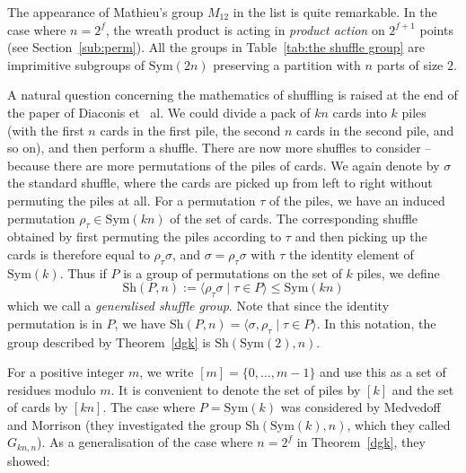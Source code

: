 \documentclass[12pt]{amsart}
\theoremstyle{remark}
\theoremstyle{definition}
\newcommand{\sym}{\mathrm{Sym}}
\newcommand{\sh}{\mathrm{Sh}}
\begin{document}
The appearance of Mathieu's group $M_{12}$ in the  list is quite remarkable. In the case where $n=2^f$, the wreath product  is acting in \emph{product action} on $2^{f+1}$ points (see Section~\ref{sub:perm}). All the groups in Table~\ref{tab:the shuffle group} are imprimitive subgroups of $\sym(2n)$ preserving a partition with $n$ parts of size $2$.


A natural question concerning the mathematics of shuffling is raised at the end of the paper of Diaconis et ~al. We could divide a pack of $kn$ cards into $k$ piles (with the first $n$ cards in the first pile, the second $n$ cards in the second pile, and so on), and then perform a shuffle. There are now more shuffles to consider -- because there are more permutations of the piles of cards. We again denote by $\sigma$ the standard shuffle, where the cards are picked up from left to right without permuting the piles at all. For a permutation $\tau$ of the piles, we have an induced permutation $\rho_\tau \in \sym(kn)$ of the set of cards. The corresponding shuffle obtained by first permuting the piles according to $\tau$ and then picking up the cards is therefore equal to $\rho_\tau \sigma$, and $\sigma = \rho_\tau\sigma$ with $\tau$ the identity element of $\sym(k)$. Thus if $P$ is a group of permutations on the set of $k$ piles, we define
$$\sh(P,n) := \langle \rho_\tau \sigma  \mid \tau \in P \rangle \leqslant \sym(kn)$$
which we call a \emph{generalised shuffle group}. Note that since the identity permutation is in $P$, we have $\sh(P,n ) = \langle \sigma, \rho_\tau \mid \tau \in P \rangle$.
%
In this notation, the group described by Theorem~\ref{dgk} is $\sh(\sym(2),n)$. 

For a positive integer $m$, we write $[m]=\{0,\dots,m-1\}$ and use this as a set of residues modulo $m$. It is convenient to denote the set of piles by $[k]$ and the set of cards by $[kn]$. 
The case where $P=\sym(k)$ was considered by Medvedoff and Morrison \cite{MM} (they investigated the group $\sh(\sym(k),n)$, which they called $G_{kn,n}$). As a generalisation of the case where $n=2^f$ in Theorem~\ref{dgk}, they showed:

\end{document}

